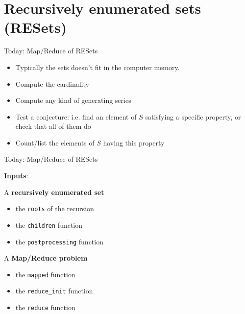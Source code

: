\documentclass[compress,11pt]{beamer}
\begin{document}
\section{Recursively enumerated sets (RESets)}
\begin{frame}[fragile]{Today: Map/Reduce of RESets}

  \begin{center}
  \end{center}
  \bigskip\pause

  \begin{itemize}
  \item Typically the sets doesn't fit in the computer memory.
    \bigskip

  \item Compute the cardinality
  \item Compute any kind of generating series
  \item Test a conjecture: i.e. find an element of $S$ satisfying a specific
    property, or check that all of them do
  \item Count/list the elements of $S$ having this property
  \end{itemize}
\end{frame}

\begin{frame}[fragile]{Today: Map/Reduce of RESets}

  \textbf{Inputs}:
  \bigskip

  A \textbf{recursively enumerated set}
  \begin{itemize}
  \item the \texttt{roots} of the recursion
  \item the \texttt{children} function
  \item the \texttt{postprocessing} function
  \end{itemize}
  A \textbf{Map/Reduce problem}
  \begin{itemize}
  \item the \texttt{mapped} function
  \item the \verb|reduce_init| function
  \item the \texttt{reduce} function
  \end{itemize}
\end{frame}
\end{document}
